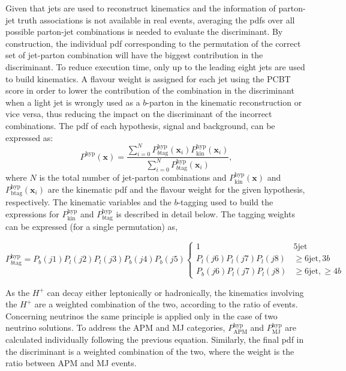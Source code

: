 Given that jets are used to reconstruct kinematics and the information of parton-jet truth associations is not available in real events, averaging the pdfs over all possible parton-jet combinations is needed to evaluate the discriminant. By construction, the individual pdf corresponding to the permutation of the correct set of jet-parton combination will have the biggest contribution in the discriminant. To reduce execution time, only up to the leading eight jets are used to build kinematics. A flavour weight is assigned for each jet using the PCBT score in order to lower the contribution of the combination in the discriminant when a light jet is wrongly used as a $b$-parton in the kinematic reconstruction or vice versa, thus reducing the impact on the discriminant of the incorrect combinations. The pdf of each hypothesis, signal and background, can be expressed as:
\begin{equation}
    P^{\text{hyp}}(\textbf{x})=\frac{\sum_{i=0}^N P^{\text{hyp}}_{b\text{tag}}(\textbf{x}_i)P^{\text{hyp}}_{\text{kin}}(\textbf{x}_i)}{\sum_{i=0}^N P^{\text{hyp}}_{b\text{tag}}(\textbf{x}_i)},
    \label{eq3:PDF}
\end{equation}
where $N$ is the total number of jet-parton combinations and $P^{\text{hyp}}_{\text{kin}}(\textbf{x})$ and $P^{\text{hyp}}_{\text{btag}}(\textbf{x}_i)$ are the kinematic pdf and the flavour weight for the given hypothesis, respectively. The kinematic variables and the $b$-tagging used to build the expressions for $P^{\text{hyp}}_{\text{kin}}$ and $P^{\text{hyp}}_{b\text{tag}}$ is described in detail below. The tagging weights can be expressed (for a single permutation) as,

\begin{equation}
    P^{\text{hyp}}_{b\text{tag}}=P_b(j1)P_l(j2)P_l(j3)P_b(j4)P_b(j5)\begin{cases}1&5\text{jet}\\P_l(j6)P_l(j7)P_l(j8)& \geq6\text{jet},3b\\P_b(j6)P_l(j7)P_l(j8)&\geq6\text{jet},\geq4b\end{cases}
\end{equation}

As the $H^+$ can decay either leptonically or hadronically, the kinematics involving the $H^+$ are a weighted combination of the two, according to the ratio of events. Concerning neutrinos the same principle is applied only in the case of two neutrino solutions. To address the APM and MJ categories, $P^{\text{hyp}}_{\text{APM}}$ and $P^{\text{hyp}}_{\text{MJ}}$ are calculated individually following the previous equation. Similarly, the final pdf in the discriminant is a weighted combination of the two, where the weight is the ratio between APM and MJ events.


